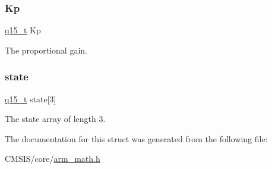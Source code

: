 \subsubsection{\texorpdfstring{Kp}{Kp}}
{\footnotesize\ttfamily \mbox{\hyperlink{arm__math_8h_ab5a8fb21a5b3b983d5f54f31614052ea}{q15\+\_\+t}} Kp}

The proportional gain. \mbox{\label{structarm__pid__instance__q15_a4c4e19d77015f5f7a31a1daf0faf31b6}} 
\subsubsection{\texorpdfstring{state}{state}}
{\footnotesize\ttfamily \mbox{\hyperlink{arm__math_8h_ab5a8fb21a5b3b983d5f54f31614052ea}{q15\+\_\+t}} state\mbox{[}3\mbox{]}}

The state array of length 3. 

The documentation for this struct was generated from the following file\+:\begin{DoxyCompactItemize}
\item 
C\+M\+S\+I\+S/core/\mbox{\hyperlink{arm__math_8h}{arm\+\_\+math.\+h}}\end{DoxyCompactItemize}
